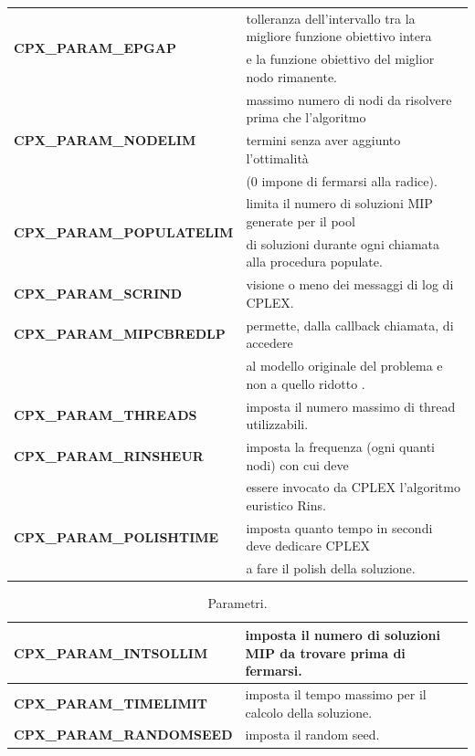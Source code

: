 \begin{table}[h]
\centering\footnotesize
\begin{tabular}{|l|l|}
\hline
\multirow{2}{*}{\textbf{CPX\_PARAM\_EPGAP}} & {tolleranza dell'intervallo tra la migliore funzione obiettivo intera}\\
& { e la funzione obiettivo del miglior nodo rimanente.}\\
\hline
\multirow{3}{*}{\textbf{CPX\_PARAM\_NODELIM}} & {massimo numero di nodi da risolvere prima che l'algoritmo}\\
& { termini senza aver aggiunto l'ottimalità}\\
& {(0 impone di fermarsi alla radice).}\\
\hline
\multirow{2}{*}{\textbf{CPX\_PARAM\_POPULATELIM}} & {limita il numero di soluzioni MIP generate per il pool  }\\
& {di soluzioni durante ogni chiamata alla procedura populate.}\\
\hline
\textbf{CPX\_PARAM\_SCRIND} & {visione o meno dei messaggi di log di CPLEX.}\\
\hline
\textbf{CPX\_PARAM\_MIPCBREDLP} & {permette, dalla callback chiamata, di accedere  }\\
&{al modello originale del problema e non a quello ridotto .}\\
\hline
\textbf{CPX\_PARAM\_THREADS} & {imposta il numero massimo di thread utilizzabili. }\\
\hline
\textbf{CPX\_PARAM\_RINSHEUR} & {imposta la frequenza (ogni quanti nodi) con cui deve}\\
&{essere invocato da CPLEX l'algoritmo euristico Rins.}\\
\hline
\textbf{CPX\_PARAM\_POLISHTIME} & {imposta quanto tempo in secondi deve dedicare CPLEX}\\
&{a fare il polish della soluzione.}\\
\hline
\end{tabular}
\end{table}
\begin{table}[h]
\centering\footnotesize
\begin{tabular}{|l|l|}
\hline
\textbf{CPX\_PARAM\_INTSOLLIM}&{imposta il numero di soluzioni MIP da trovare prima di fermarsi.}\\
\hline
\textbf{CPX\_PARAM\_TIMELIMIT}&{imposta il tempo massimo per il calcolo della soluzione.}\\
\hline
\textbf{CPX\_PARAM\_RANDOMSEED}&{imposta il random seed.}\\
\hline
\end{tabular}
\caption{Parametri.}\label{param_table}
\end{table}
\vspace{2 cm}
